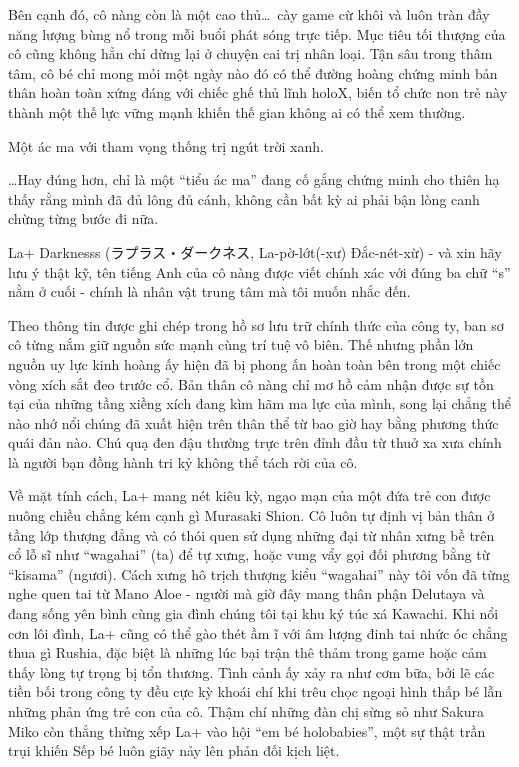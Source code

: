 \documentclass[../main.tex]{subfiles}
\begin{document}
Bên cạnh đó, cô nàng còn là một cao thủ\dots\ cày game cừ khôi và luôn tràn đầy năng lượng bùng nổ trong mỗi buổi phát sóng trực tiếp. Mục tiêu tối thượng của cô cũng không hẳn chỉ dừng lại ở chuyện cai trị nhân loại. Tận sâu trong thâm tâm, cô bé chỉ mong mỏi một ngày nào đó có thể đường hoàng chứng minh bản thân hoàn toàn xứng đáng với chiếc ghế thủ lĩnh holoX, biến tổ chức non trẻ này thành một thế lực vững mạnh khiến thế gian không ai có thể xem thường.

Một ác ma với tham vọng thống trị ngút trời xanh.

\dots Hay đúng hơn, chỉ là một ``tiểu ác ma'' đang cố gắng chứng minh cho thiên hạ thấy rằng mình đã đủ lông đủ cánh, không cần bất kỳ ai phải bận lòng canh chừng từng bước đi nữa.

\chrint

La+ Darknesss (ラプラス・ダークネス, La-pờ-lớt(-xư) Đắc-nét-xừ) - và xin hãy lưu ý thật kỹ, tên tiếng Anh của cô nàng được viết chính xác với đúng ba chữ ``s'' nằm ở cuối - chính là nhân vật trung tâm mà tôi muốn nhắc đến.

Theo thông tin được ghi chép trong hồ sơ lưu trữ chính thức của công ty, ban sơ cô từng nắm giữ nguồn sức mạnh cùng trí tuệ vô biên. Thế nhưng phần lớn nguồn uy lực kinh hoàng ấy hiện đã bị phong ấn hoàn toàn bên trong một chiếc vòng xích sắt đeo trước cổ. Bản thân cô nàng chỉ mơ hồ cảm nhận được sự tồn tại của những tầng xiềng xích đang kìm hãm ma lực của mình, song lại chẳng thể nào nhớ nổi chúng đã xuất hiện trên thân thể từ bao giờ hay bằng phương thức quái đản nào. Chú quạ đen đậu thường trực trên đỉnh đầu từ thuở xa xưa chính là người bạn đồng hành tri kỷ không thể tách rời của cô.


Về mặt tính cách, La+ mang nét kiêu kỳ, ngạo mạn của một đứa trẻ con được nuông chiều chẳng kém cạnh gì Murasaki Shion. Cô luôn tự định vị bản thân ở tầng lớp thượng đẳng và có thói quen sử dụng những đại từ nhân xưng bề trên cổ lỗ sĩ như ``wagahai'' (ta) để tự xưng, hoặc vung vẩy gọi đối phương bằng từ ``kisama'' (ngươi). Cách xưng hô trịch thượng kiểu ``wagahai'' này tôi vốn đã từng nghe quen tai từ Mano Aloe - người mà giờ đây mang thân phận Delutaya và đang sống yên bình cùng gia đình chúng tôi tại khu ký túc xá Kawachi. Khi nổi cơn lôi đình, La+ cũng có thể gào thét ầm ĩ với âm lượng đinh tai nhức óc chẳng thua gì Rushia, đặc biệt là những lúc bại trận thê thảm trong game hoặc cảm thấy lòng tự trọng bị tổn thương. Tình cảnh ấy xảy ra như cơm bữa, bởi lẽ các tiền bối trong công ty đều cực kỳ khoái chí khi trêu chọc ngoại hình thấp bé lẫn những phản ứng trẻ con của cô. Thậm chí những đàn chị sừng sỏ như Sakura Miko còn thẳng thừng xếp La+ vào hội ``em bé holobabies'', một sự thật trần trụi khiến Sếp bé luôn giãy nảy lên phản đối kịch liệt.
\end{document}
